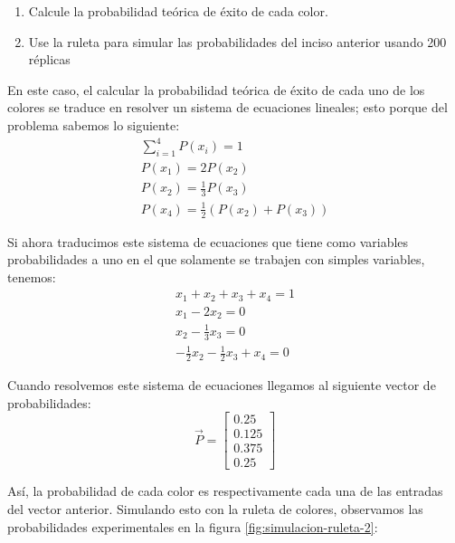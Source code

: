 \documentclass{article}
\begin{document}
            \begin{enumerate}
                \item Calcule la probabilidad teórica de éxito de cada color.
                \item Use la ruleta para simular las probabilidades del inciso anterior usando 200 réplicas
            \end{enumerate}

            En este caso, el calcular la probabilidad teórica de éxito de cada uno de los colores se traduce en resolver un sistema de ecuaciones lineales; esto porque del problema sabemos lo siguiente:
            \begin{gather*}
                \sum_{i=1}^{4} P(x_i) = 1 \\
                P(x_1) = 2 P(x_2) \\
                P(x_2) = \frac{1}{3} P(x_3) \\
                P(x_4) = \frac{1}{2} (P(x_2) + P(x_3))
            \end{gather*}

            Si ahora traducimos este sistema de ecuaciones que tiene como variables probabilidades a uno en el que solamente se trabajen con simples variables, tenemos:
            \begin{gather*}
                x_1 + x_2 + x_3 + x_4 = 1 \\
                x_1 - 2x_2 = 0 \\
                x_2 - \frac{1}{3}x_3 = 0 \\
                -\frac{1}{2}x_2 - \frac{1}{2}x_3 + x_4 = 0
            \end{gather*}

            Cuando resolvemos este sistema de ecuaciones llegamos al siguiente vector de probabilidades:
            \begin{equation*}
                \vec{P} = \begin{bmatrix}
                    0.25 \\
                    0.125 \\
                    0.375 \\
                    0.25
                \end{bmatrix}
            \end{equation*}

            Así, la probabilidad de cada color es respectivamente cada una de las entradas del vector anterior. Simulando esto con la ruleta de colores, observamos las probabilidades experimentales en la figura \ref{fig:simulacion-ruleta-2}:
\end{document}
